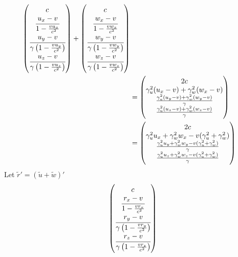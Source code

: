 \documentclass[10pt,a4paper]{article}
\theoremstyle{break}
\begin{document}
\begin{enumerate}
\begin{equation*}
\begin{split}
\begin{pmatrix}
          c \\
          \cfrac{u_x - v}{1 - \frac{vu_x}{c^2}}\\
          \cfrac{u_y - v}{\gamma\left(1 - \frac{vu_y}{c^2}\right)}\\
          \cfrac{u_z - v}{\gamma\left(1 - \frac{vu_z}{c^2}\right)}
        \end{pmatrix} +
        \begin{pmatrix}
          c \\
          \cfrac{w_x - v}{1 - \frac{vw_x}{c^2}}\\
          \cfrac{w_y - v}{\gamma\left(1 - \frac{vw_y}{c^2}\right)}\\
          \cfrac{w_z - v}{\gamma\left(1 - \frac{vw_z}{c^2}\right)}
        \end{pmatrix}\\
        &= \begin{pmatrix}
          2c \\
          \gamma_u^2(u_x-v) + \gamma^2_w(w_x-v)\\
          \frac{\gamma_u^2(u_y-v) + \gamma^2_w(w_y-v)}{\gamma}\\
          \frac{\gamma_u^2(u_z-v) + \gamma^2_w(w_z-v)}{\gamma}
        \end{pmatrix}\\
        &= \begin{pmatrix}
          2c \\
          \gamma_u^2u_x + \gamma_w^2w_x - v(\gamma^2_u+\gamma^2_w)\\
          \frac{\gamma_u^2u_y + \gamma_w^2w_y - v(\gamma^2_u+\gamma^2_w)}{\gamma}\\
          \frac{\gamma_u^2u_z + \gamma_w^2w_z - v(\gamma^2_u+\gamma^2_w)}{\gamma}
        \end{pmatrix}
      \end{split}
    \end{equation*}
    Let $\widetilde{r}' = (\widetilde{u}+\widetilde{w})'$
    \begin{equation*}
      \begin{split}
        \begin{pmatrix}
          c \\
          \cfrac{r_x - v}{1 - \frac{vr_x}{c^2}}\\
          \cfrac{r_y - v}{\gamma\left(1 - \frac{vr_y}{c^2}\right)}\\
          \cfrac{r_z - v}{\gamma\left(1 - \frac{vr_z}{c^2}\right)}
        \end{pmatrix}

\end{split}
\end{equation*}
\end{enumerate}
\end{document}
